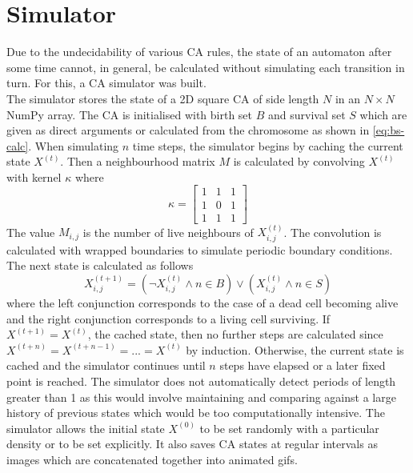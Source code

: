 \section{Simulator} \label{subsec:simulator}
Due to the undecidability of various CA rules, the state of an automaton after some time cannot, in general, be calculated without simulating each transition in turn. For this, a CA simulator was built.\\

The simulator stores the state of a 2D square CA of side length $N$ in an $N \times N$ NumPy array. The CA is initialised with birth set $B$ and survival set $S$ which are given as direct arguments or calculated from the chromosome as shown in \ref{eq:bs-calc}. When simulating $n$ time steps, the simulator begins by caching the current state $X^{(t)}$. Then a neighbourhood matrix $M$ is calculated by convolving $X^{(t)}$ with kernel $\kappa$ where
\[
    \kappa = \begin{bmatrix}
        1 & 1 & 1\\
        1 & 0 & 1\\
        1 & 1 & 1
        \end{bmatrix}    
\]
The value $M_{i,j}$ is the number of live neighbours of $X^{(t)}_{i,j}$. The convolution is calculated with wrapped boundaries to simulate periodic boundary conditions. The next state is calculated as follows
\[
    X^{(t+1)}_{i,j}= (\lnot X^{(t)}_{i,j} \land n \in B) \lor (X^{(t)}_{i,j} \land n \in S)
\]
where the left conjunction corresponds to the case of a dead cell becoming alive and the right conjunction corresponds to a living cell surviving. If $X^{(t+1)} = X^{(t)}$, the cached state, then no further steps are calculated since $X^{(t + n)} = X^{(t + n - 1)} = ... = X^{(t)}$ by induction. Otherwise, the current state is cached and the simulator continues until $n$ steps have elapsed or a later fixed point is reached. The simulator does not automatically detect periods of length greater than 1 as this would involve maintaining and comparing against a large history of previous states which would be too computationally intensive. The simulator allows the initial state $X^{(0)}$ to be set randomly with a particular density or to be set explicitly. It also saves CA states at regular intervals as images which are concatenated together into animated gifs.\\

